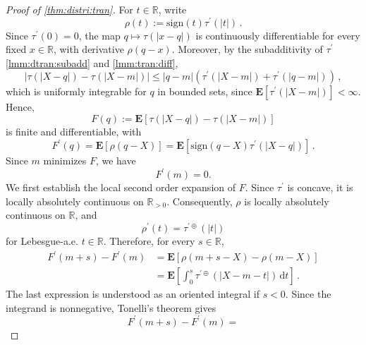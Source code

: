 \documentclass{article}
\newcommand{\R}{\mathbb{R}}
\newcommand{\Rpp}{\R_{>0}}
\newcommand{\lab}{\left[} %
\newcommand{\rab}{\right]} %
\newcommand{\ab}[1]{\lab #1 \rab} %
\newcommand{\abOf}[1]{\!\ab{#1}} %
\newcommand{\lb}{\left(} %
\newcommand{\rb}{\right)} %
\newcommand{\br}[1]{\lb #1 \rb} %
\newcommand{\absOf}[1]{\left\vert #1 \right\vert} %
\newcommand{\E}{\mathbf{E}} %
\newcommand{\Eof}[1]{\E[#1]}
\newcommand{\EOf}[1]{\E\abOf{#1}}
\newcommand{\pr}{^\prime}
\newcommand{\eqcm}{\,,} %
\newcommand{\eqfs}{\,.}
\newcommand{\dl}{\mathrm{d}} %
\newcommand{\tran}{\tau}
\newcommand{\dtran}{\tau\pr}
\newcommand{\ddrtran}{\tau^{\prime\oplus}}
\newcommand{\sign}{\mathrm{sign}}
\begin{document}
\begin{proof}[Proof of \cref{thm:distri:tran}]
    For $t\in\R$, write
    \begin{equation}
        \rho(t)
        :=
        \sign(t)\dtran(|t|)
        \eqfs
    \end{equation}
    Since $\dtran(0)=0$, the map
    $q\mapsto \tran(|x-q|)$ is continuously differentiable for every fixed
    $x\in\R$, with derivative $\rho(q-x)$.
    Moreover, by the subadditivity of $\dtran$ \cref{lmm:dtran:subadd}
    and \cref{lmm:tran:diff},
    \begin{equation}
        \absOf{\tran(|X-q|)-\tran(|X-m|)}
        \leq
        |q-m| \br{\dtran(|X-m|)+\dtran(|q-m|)}
        \eqcm
    \end{equation}
    which is uniformly integrable for $q$ in bounded sets, since
    $\Eof{\dtran(|X-m|)} < \infty$. Hence,
    \begin{equation}
        F(q)
        :=
        \Eof{\tran(|X-q|)-\tran(|X-m|)}
    \end{equation}
    is finite and differentiable, with
    \begin{equation}
        F\pr(q)
        =
        \Eof{\rho(q-X)}
        =
        \Eof{\sign(q-X)\dtran(|X-q|)}
        \eqfs
    \end{equation}
    Since $m$ minimizes $F$, we have
    \begin{equation}\label{eq:Fprime:m:zero}
        F\pr(m)=0.
    \end{equation}
    We first establish the local second order expansion of $F$. 
    Since $\dtran$ is concave, it is locally absolutely continuous on $\Rpp$.
    Consequently, $\rho$ is locally absolutely continuous on $\R$, and
    \begin{equation}
        \rho\pr(t)
        =
        \ddrtran(|t|)
    \end{equation}
    for Lebesgue-a.e. $t\in\R$. Therefore, for every $s\in\R$,
    \begin{align}
        F\pr(m+s)-F\pr(m)
        &=
        \EOf{\rho(m+s-X)-\rho(m-X)}
        \\
        &=
        \EOf{
            \int_0^s
            \ddrtran(|X-m-t|)
            \,\dl t
        }
        \eqfs
    \end{align}
    The last expression is understood as an oriented integral if $s<0$.
    Since the integrand is nonnegative, Tonelli's theorem gives
    \begin{equation}\label{eq:Fprime}
        F\pr(m+s)-F\pr(m)
        =

\end{equation}
\end{proof}
\end{document}
